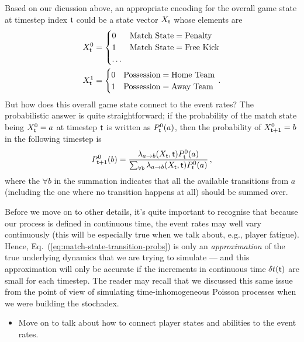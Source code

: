 Based on our dicussion above, an appropriate encoding for the overall game state at timestep index ${\sf t}$ could be a state vector $X_{{\sf t}}$ whose elements are
\begin{align}
X^0_{{\sf t}}&=\begin{cases} 0 & \text{Match State} = \text{Penalty}\\ 1 & \text{Match State} = \text{Free Kick} \\ \dots & \end{cases} \\
X^1_{{\sf t}}&=\begin{cases} 0 & \text{Possession} = \text{Home Team}\\ 1 & \text{Possession} = \text{Away Team} \end{cases} \,.
\end{align}
But how does this overall game state connect to the event rates? The probabilistic answer is quite straightforward; if the probability of the match state being $X^0_{{\sf t}}=a$ at timestep ${\sf t}$ is written as $P^0_{{\sf t}}(a)$, then the probability of $X^0_{{\sf t}+1}=b$ in the following timestep is
\begin{align}
P^0_{{\sf t}+1}(b) = \frac{\lambda_{a\rightarrow b} (X_{\sf t}, {\sf t})P^0_{{\sf t}}(a)}{\sum_{\forall b}\lambda_{a\rightarrow b} (X_{\sf t}, {\sf t})P^0_{{\sf t}}(a)} \label{eq:match-state-transition-probs}\,,
\end{align}
where the $\forall b$ in the summation indicates that all the available transitions from $a$ (including the one where no transition happens at all) should be summed over.

Before we move on to other details, it's quite important to recognise that because our process is defined in continuous time, the event rates may well vary continuously (this will be especially true when we talk about, e.g., player fatigue). Hence, Eq.~(\ref{eq:match-state-transition-probs}) is only an \emph{approximation} of the true underlying dynamics that we are trying to simulate --- and this approximation will only be accurate if the increments in continuous time $\delta t({\sf t})$ are small for each timestep. The reader may recall that we discussed this same issue from the point of view of simulating time-inhomogeneous Poisson processes when we were building the stochadex.

\begin{itemize}
\item{Move on to talk about how to connect player states and abilities to the event rates.}
\end{itemize}

